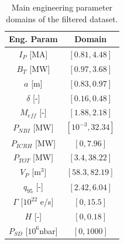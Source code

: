 \documentclass[a4paper, twoside, final, 12pt]{article}
\begin{document}
\begin{table}
\centering
\caption{Main engineering parameter domains of the filtered dataset.}
\label{tab:main_domain}
\begin{tabular}{| c | c | }
	\hline
	Eng. Param & Domain \\
	\hline
	$I_P$ [MA] & $[0.81, 4.48]$ \\
	$B_T$ [MW] & $[0.97, 3.68]$ \\
	$a$ [m] & $[0.83, 0.97]$ \\
	$\delta$ [-] & $[0.16, 0.48]$ \\
	$M_{eff}$ [-] & $[1.88, 2.18]$ \\
	$P_{NBI}$ [MW] & $[10^{-3}, 32.34]$ \\
	$P_{ICRH}$ [MW] & $[0, 7.96]$ \\
	$P_{TOT}$ [MW] & $[3.4, 38.22]$ \\
	$V_P$ [m$^3$] &  $[58.3, 82.19]$ \\
	$q_{95}$ [-] & $[2.42, 6.04]$ \\
	$\Gamma$ [$10^{22}$ e/s] & $[0, 15.5]$ \\
	$H$ [-] & $[0, 0.18]$ \\
	$P_{SD}$ [$10^6$nbar] & $[0,1000]$ \\
	\hline
\end{tabular}
\end{table}
\end{document}
